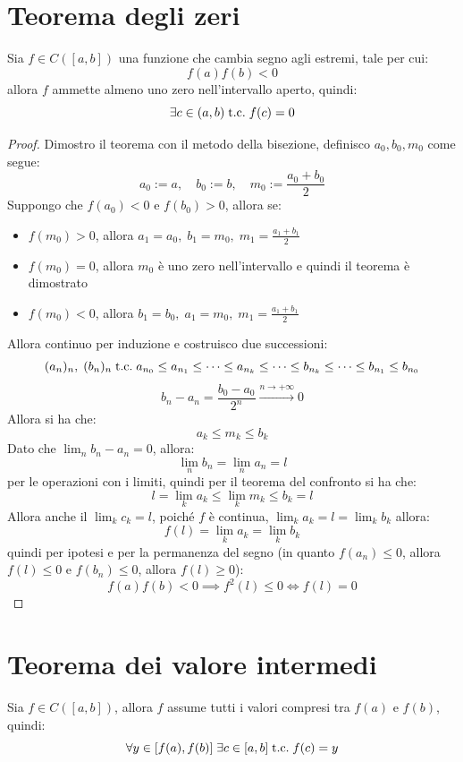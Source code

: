 \documentclass[a4paper,12pt,openright]{book}
\begin{document}
    \section{Teorema degli zeri}
    Sia $f \in C([a, b])$ una funzione che cambia segno agli estremi, tale per cui:
    \[f(a)f(b) < 0\]
    allora $f$ ammette almeno uno zero nell'intervallo aperto, quindi:
    \[\exists c \in (a, b) \;\text{t.c.}\; f(c) = 0\]
    \begin{proof}
    	Dimostro il teorema con il metodo della bisezione, definisco $a_0, b_0, m_0$ come segue:
    	\[a_0 := a, \quad b_0 := b, \quad m_0 := \frac{a_0 + b_0}{2}\]
    	Suppongo che $f(a_0) < 0$ e $f(b_0) > 0$, allora se:
    	\begin{itemize}
    		\item $f(m_0) > 0$, allora $a_1 = a_0, \; b_1 = m_0, \; m_1 = \frac{a_1 + b_1}{2}$
    		\item $f(m_0) = 0$, allora $m_0$ è uno zero nell'intervallo e quindi il teorema è dimostrato
    		\item $f(m_0) < 0$, allora $b_1 = b_0, \; a_1 = m_0, \; m_1 = \frac{a_1 + b_1}{2}$
    	\end{itemize}
    	Allora continuo per induzione e costruisco due successioni:
    	\[(a_n)_n, \; (b_n)_n \;\text{t.c.}\; a_{n_0} \leq a_{n_1} \leq \cdots \leq a_{n_k} \leq \cdots \leq b_{n_k} \leq \cdots \leq b_{n_1} \leq b_{n_0}\]
    	\[b_n - a_n = \frac{b_0 - a_0}{2^n} \overset{n \rightarrow +\infty}{\longrightarrow} 0\]
    	Allora si ha che:
    	\[a_k \leq m_k \leq b_k\]
    	Dato che $\lim_{n} b_n - a_n = 0$, allora:
    	\[\lim_{n} b_n = \lim_{n} a_n = l\] 
    	per le operazioni con i limiti, quindi per il teorema del confronto si ha che:
    	\[l = \lim_{k} a_k \leq \lim_{k} m_k \leq b_k = l\]
    	Allora anche il $\lim_{k} c_k = l$, poiché $f$ è continua, $\lim_{k} a_k = l = \lim_{k} b_k$
    	allora:
    	\[f(l) = \lim_{k} a_k = \lim_{k} b_k\]
    	quindi per ipotesi e per la permanenza del segno (in quanto $f(a_n) \leq 0$, allora $f(l) \leq 0$ e $f(b_n) \leq 0$, allora $f(l) \geq 0$):
    	\[f(a)f(b) < 0 \implies f^2(l) \leq 0 \iff f(l) = 0\]
    \end{proof}
    
    \section{Teorema dei valore intermedi}
    Sia $f \in C([a, b])$, allora $f$ assume tutti i valori compresi tra $f(a)$ e $f(b)$, quindi:
    \[\forall y \in [f(a), f(b)]\; \exists c \in [a, b] \;\text{t.c.}\; f(c) = y\]
    
\end{document}

